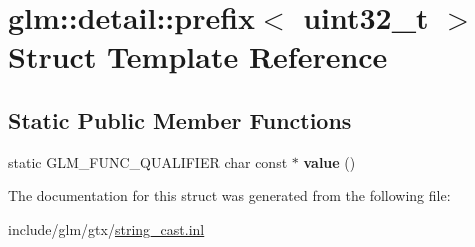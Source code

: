\hypertarget{structglm_1_1detail_1_1prefix_3_01uint32__t_01_4}{}\section{glm\+:\+:detail\+:\+:prefix$<$ uint32\+\_\+t $>$ Struct Template Reference}
\label{structglm_1_1detail_1_1prefix_3_01uint32__t_01_4}
\subsection*{Static Public Member Functions}
\begin{DoxyCompactItemize}
\item 
\mbox{\label{structglm_1_1detail_1_1prefix_3_01uint32__t_01_4_a8a36d8e3a869d300408dde031429352e}} 
static G\+L\+M\+\_\+\+F\+U\+N\+C\+\_\+\+Q\+U\+A\+L\+I\+F\+I\+ER char const  $\ast$ {\bfseries value} ()
\end{DoxyCompactItemize}


The documentation for this struct was generated from the following file\+:\begin{DoxyCompactItemize}
\item 
include/glm/gtx/\hyperlink{string__cast_8inl}{string\+\_\+cast.\+inl}\end{DoxyCompactItemize}
